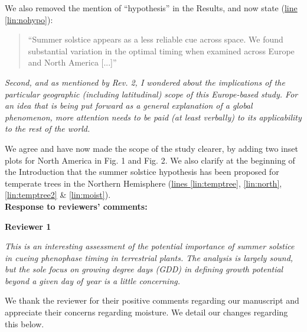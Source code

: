 \documentclass[11pt,letter]{article}
\begin{document}
We also removed the mention of ``hypothesis'' in the Results, and now state (\href{file:synchrony_r1\#lintarget:nohypo}{line \ref*{lin:nohypo}}):
\begin{quote}
    ``Summer solstice appears as a less reliable cue across space. We found substantial variation in the optimal timing when examined across Europe and North America [...]''
\end{quote}

\begin{mybox}
\emph{Second, and as mentioned by Rev. 2, I wondered about the implications of the particular geographic (including latitudinal) scope of this Europe-based study. For an idea that is being put forward as a general explanation of a global phenomenon, more attention needs to be paid (at least verbally) to its applicability to the rest of the world.}
\end{mybox}

We agree and have now  made the scope of the study clearer, by adding two inset plots for North America in Fig. 1 and Fig. 2. We also clarify at the beginning of the Introduction that the summer solstice hypothesis has been proposed for temperate trees in the Northern Hemisphere (\href{file:synchrony_r1\#lintarget:temptree}{lines \ref*{lin:temptree}}, \href{file:synchrony_r1\#lintarget:north}{\ref*{lin:north}}, \href{file:synchrony_r1\#lintarget:temptree2}{\ref*{lin:temptree2}} \& \href{file:synchrony_r1\#lintarget:moist}{\ref*{lin:moist}}).\\

{\bf Response to reviewers' comments:} 

{\bf Reviewer 1}

\begin{mybox}
\emph{This is an interesting assessment of the potential importance of summer solstice in cueing phenophase timing in terrestrial plants. The analysis is largely sound, but the sole focus on growing degree days (GDD) in defining growth potential beyond a given day of year is a little concerning.}
\end{mybox}

We thank the reviewer for their positive comments regarding our manuscript and appreciate their concerns regarding moisture. We detail our changes regarding this below.\\
\end{document}
